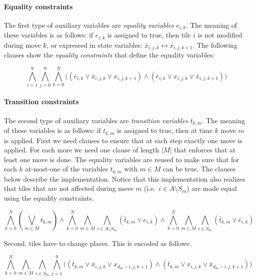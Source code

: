 \documentclass[]{llncs}
\begin{document}
\paragraph{Equality constraints} The first type of auxiliary variables are {\em equality variables} $e_{i,k}$. The
meaning of these variables is as follows: if $e_{i,k}$ is assigned to true, then tile $i$ is not modified during move
$k$, or expressed in state variables: $\bar x_{i,j,k} \leftrightarrow \bar x_{i,j,k+1}$. The following clauses show the
{\em equality constraints} that define the equality variables:

\begin{equation}
\bigwedge_{i=1}^9 \bigwedge_{j=0}^9 \bigwedge_{k=0}^{N} \big( (\bar e_{i,k} \lor \bar x_{i,j,k} \lor x_{i,j,k+1}) \land
(\bar e_{i,k} \lor x_{i,j,k} \lor \bar x_{i,j,k+1}) \big )
\end{equation}

\paragraph{Transition constraints} The second type of auxiliary variables are {\em transition variables} $t_{k,m}$.
The meaning of these variables is as follows: if $t_{k,m}$ is assigned to true, then at time $k$ move $m$ is applied.
First we need clauses to ensure that at each step exactly one move is applied. For each more we need one clause of
length $|M|$ that enforces that at least one move is done. The equality variables are reused to make sure that for each $k$
at-most-one of the variables $t_{k,m}$ with $m \in M$ can be true. The clauses below describe the implementation.
Notice that this implementation also realizes that tiles that are not affected during move $m$ (i.e.\ $i \in A \setminus S_m$)
are made equal using the equality constraints.

\begin{equation}
\bigwedge_{k=0}^{N} (\bigvee_{m \in M} t_{k,m}) \land \bigwedge_{k=0}^{N} \bigwedge_{m \in M} \bigwedge_{i \in A
\setminus S_m} (\bar t_{k,m} \lor e_{i,k}) \land \bigwedge_{k=0}^{N} \bigwedge_{m \in M} \bigwedge_{i \in S_m} (\bar
t_{k,m} \lor \bar e_{i,k})
\end{equation}

Second, tiles have to change places. This is encoded as follows:

\begin{equation}
\bigwedge_{k=0}^{N} \bigwedge_{m \in M} \bigwedge_{i \in S_m} \bigwedge_{j=1}^9 \big( (\bar t_{k,m} \lor \bar x_{i,j,k}
\lor x_{d_m - i,j,k + 1} ) \land (\bar t_{k,m} \lor x_{i,j,k} \lor \bar x_{d_m - i,j,k + 1} ) \big)
\end{equation}
\end{document}

